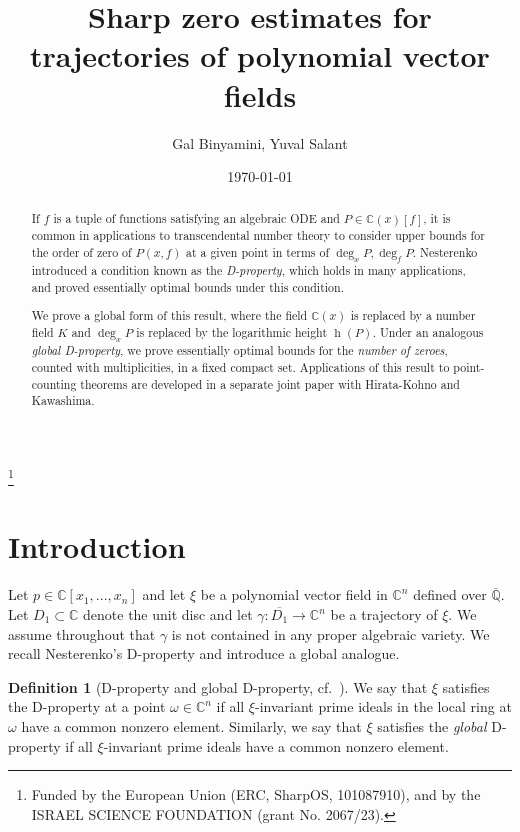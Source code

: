 \documentclass[reqno]{amsart}
\theoremstyle{plain}
\theoremstyle{definition}
\newtheorem{Def}[Cor]{Definition}
\theoremstyle{remark}
\theoremstyle{plain}
\begin{document}
\title{Sharp zero estimates for trajectories of polynomial vector fields}
\author{Gal Binyamini, Yuval Salant} 

\address{Weizmann Institute of Science, Rehovot, Israel}
 \thanks{
  Funded by the European Union (ERC, SharpOS, 101087910), and by the
  ISRAEL SCIENCE FOUNDATION (grant No. 2067/23).}

\date{\today}

\begin{abstract}
    If $f$ is a tuple of functions satisfying an algebraic ODE and $P\in{\mathbb C}(x)[f]$, it is common in applications to transcendental number theory to consider upper bounds for the order of zero of $P(x,f)$ at a given point in terms of $\deg_x P,\deg_f P$. Nesterenko introduced a condition known as the \emph{D-property}, which holds in many applications, and proved essentially optimal bounds under this condition.

    We prove a global form of this result, where the field ${\mathbb C}(x)$ is replaced by a number field $K$ and $\deg_x P$ is replaced by the logarithmic height $\operatorname{h}(P)$. Under an analogous \emph{global D-property}, we prove essentially optimal bounds for the \emph{number of zeroes}, counted with multiplicities, in a fixed compact set. Applications of this result to point-counting theorems are developed in a separate joint paper with Hirata-Kohno and Kawashima.
\end{abstract}

\maketitle

\section{Introduction}

Let $p\in\mathbb C[x_1,...,x_n]$ and let $\xi$ be a polynomial vector field in ${\mathbb C}^n$ defined over $\overline{\mathbb Q}$. Let $D_1\subset\mathbb C$ denote the unit disc and let $\gamma:\overline{D_1}\to\mathbb C^n$ be a trajectory of $\xi$. We assume throughout that $\gamma$ is not contained in any proper algebraic variety.
We recall Nesterenko's D-property and introduce a global analogue.

\begin{Def}[D-property and global D-property, cf.~]\label{Definition D property and global D-property}
We say that $\xi$ satisfies the D-property at a point $\omega\in\mathbb C^n$ if all $\xi$-invariant prime ideals in the local ring at $\omega$ have a common nonzero element.
Similarly, we say that $\xi$ satisfies the \emph{global} D-property if all $\xi$-invariant prime ideals have a common nonzero element.
\end{Def}
\end{document}
